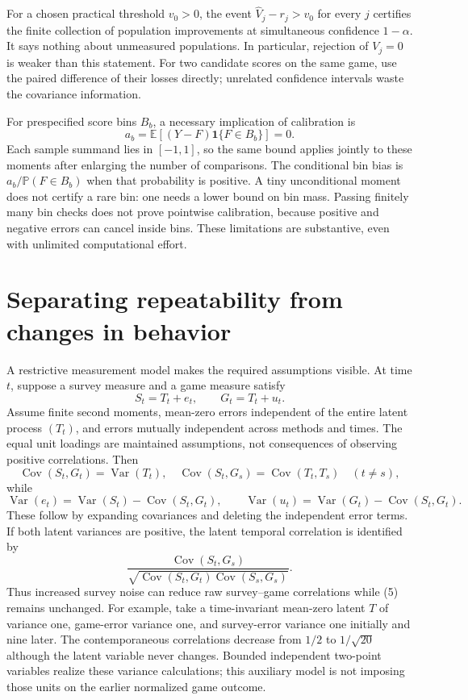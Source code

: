 \documentclass[11pt]{article}
\newcommand{\E}{\mathbb{E}}
\newcommand{\Pp}{\mathbb{P}}
\newcommand{\Var}{\operatorname{Var}}
\newcommand{\Cov}{\operatorname{Cov}}
\begin{document}
For a chosen practical threshold $v_0>0$, the event
$\widehat V_j-r_j>v_0$ for every $j$ certifies the finite collection of
population improvements at simultaneous confidence $1-\alpha$. It says
nothing about unmeasured populations. In particular, rejection of $V_j=0$
is weaker than this statement. For two candidate scores on the same game,
use the paired difference of their losses directly; unrelated confidence
intervals waste the covariance information.

For prespecified score bins $B_b$, a necessary implication of calibration
is
\[
 a_b=\E[(Y-F)\mathbf1\{F\in B_b\}]=0.
\]
Each sample summand lies in $[-1,1]$, so the same bound applies jointly to
these moments after enlarging the number of comparisons. The conditional
bin bias is $a_b/\Pp(F\in B_b)$ when that probability is positive. A tiny
unconditional moment does not certify a rare bin: one needs a lower bound
on bin mass. Passing finitely many bin checks does not prove pointwise
calibration, because positive and negative errors can cancel inside bins.
These limitations are substantive, even with unlimited computational effort.

\section{Separating repeatability from changes in behavior}
A restrictive measurement model makes the required assumptions visible.
At time $t$, suppose a survey measure and a game measure satisfy
\[
 S_t=T_t+e_t,\qquad G_t=T_t+u_t.
\]
Assume finite second moments, mean-zero errors independent of the entire
latent process $(T_t)$, and errors mutually independent across methods and
times. The equal unit loadings are maintained assumptions, not consequences
of observing positive correlations. Then
\[
 \Cov(S_t,G_t)=\Var(T_t),\quad
 \Cov(S_t,G_s)=\Cov(T_t,T_s)\quad(t\ne s),                  \tag{4}
\]
while
\[
 \Var(e_t)=\Var(S_t)-\Cov(S_t,G_t),\qquad
 \Var(u_t)=\Var(G_t)-\Cov(S_t,G_t).
\]
These follow by expanding covariances and deleting the independent error
terms. If both latent variances are positive, the latent temporal
correlation is identified by
\[
 \frac{\Cov(S_t,G_s)}{
 \sqrt{\Cov(S_t,G_t)\Cov(S_s,G_s)}}.                       \tag{5}
\]
Thus increased survey noise can reduce raw survey--game correlations while
(5) remains unchanged. For example, take a time-invariant mean-zero latent
$T$ of variance one, game-error variance one, and survey-error variance
one initially and nine later. The contemporaneous correlations decrease
from $1/2$ to $1/\sqrt{20}$ although the latent variable never changes.
Bounded independent two-point variables realize these variance calculations;
this auxiliary model is not imposing those units on the earlier normalized
game outcome.
\end{document}
